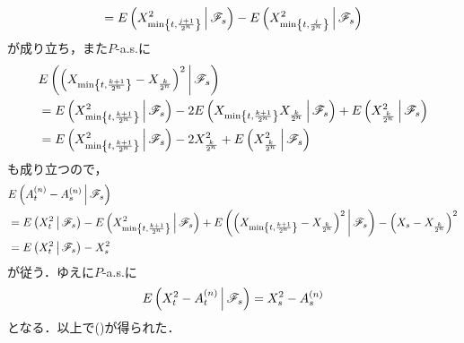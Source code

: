 \begin{sketch}
\begin{description}
\begin{align}
					= E\left( X^2_{\min\left\{t,\frac{j+1}{2^n}\right\}} \, \middle|\, \mathscr{F}_s \right)
					 - E\left( X^2_{\min\left\{t,\frac{j}{2^n}\right\}} \, \middle|\, \mathscr{F}_s \right)
				\end{align}
				が成り立ち，また$P$-a.s.に
				\begin{align}
					&E\left( \left(X_{\min\left\{t,\frac{k+1}{2^n}\right\}} - X_{\frac{k}{2^n}}\right)^2 \, \middle|\, \mathscr{F}_s \right) \\
					&= E\left( X_{\min\left\{t,\frac{k+1}{2^n}\right\}}^2 \, \middle|\, \mathscr{F}_s \right)
					- 2 E\left( X_{\min\left\{t,\frac{k+1}{2^n}\right\}}X_{\frac{k}{2^n}} \, \middle|\, \mathscr{F}_s \right)
					+ E\left( X_{\frac{k}{2^n}}^2 \, \middle|\, \mathscr{F}_s \right) \\
					&= E\left( X_{\min\left\{t,\frac{k+1}{2^n}\right\}}^2 \, \middle|\, \mathscr{F}_s \right)
					- 2 X_{\frac{k}{2^n}}^2
					+ E\left( X_{\frac{k}{2^n}}^2 \, \middle|\, \mathscr{F}_s \right) \\
				\end{align}
				も成り立つので，
				\begin{align}
					&E\left( A^{(n)}_t - A^{(n)}_s \, \middle|\, \mathscr{F}_s \right) \\
					&= E\left( X^2_t \, \middle|\, \mathscr{F}_s \right)
					- E\left( X^2_{\min\left\{t,\frac{k+1}{2^n}\right\}} \, \middle|\, \mathscr{F}_s \right)
					+ E\left( \left(X_{\min\left\{t,\frac{k+1}{2^n}\right\}} - X_{\frac{k}{2^n}}\right)^2 \, \middle|\, \mathscr{F}_s \right)
					- \left(X_s - X_{\frac{k}{2^n}}\right)^2 \\
					&= E\left( X^2_t \, \middle|\, \mathscr{F}_s \right) - X_s^2
				\end{align}
				が従う．ゆえに$P$-a.s.に
				\begin{align}
					E\left( X^2_t - A^{(n)}_t \, \middle|\, \mathscr{F}_s \right) = X^2_s - A^{(n)}_s
				\end{align}
				となる．以上で()が得られた．
				

\end{description}
\end{sketch}
